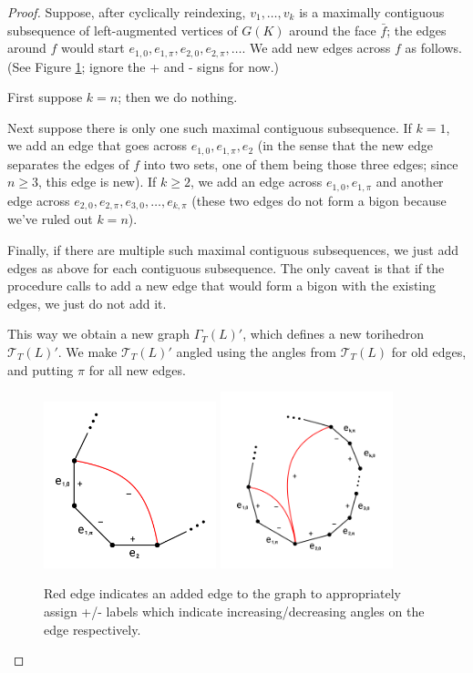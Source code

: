 \documentclass[11pt]{amsart}
\newcommand{\sT}{{\mathcal{T}}}
\theoremstyle{plain}
\theoremstyle{definition}
\begin{document}
\begin{proof}
Suppose, after cyclically reindexing, $v_1,\ldots,v_k$
is a maximally contiguous subsequence of left-augmented vertices
of $G(K)$ around the face $\bar{f}$;
the edges around $f$ would start
$e_{1,0}, e_{1,\pi}, e_{2,0}, e_{2,\pi}, \ldots$.
We add new edges across $f$ as follows.
(See Figure \ref{f:adding_edges};
ignore the + and - signs for now.)


First suppose $k=n$; then we do nothing.

Next suppose there is only one such maximal contiguous subsequence.
If $k = 1$, we add an edge that goes across
$e_{1,0},e_{1,\pi},e_2$
(in the sense that the new edge separates the edges of $f$ into two sets,
one of them being those three edges;
since $n\geq 3$, this edge is new).
If $k \geq 2$,
we add an edge across $e_{1,0},e_{1,\pi}$
and another edge across $e_{2,0},e_{2,\pi},e_{3,0},\ldots,e_{k,\pi}$
(these two edges do not form a bigon because we've ruled out $k=n$).

Finally, if there are multiple such maximal contiguous subsequences,
we just add edges as above for each contiguous subsequence.
The only caveat is that if the procedure calls to add a new edge
that would form a bigon with the existing edges,
we just do not add it.


This way we obtain a new graph $\Gamma_T(L)'$, which defines a
new torihedron $\sT_T(L)'$.
We make $\sT_T(L)'$ angled using the angles from $\sT_T(L)$ for old edges,
and putting $\pi$ for all new edges.


\begin{figure}
\includegraphics[width=5cm]{more_pictures/one_edge.png}
\includegraphics[width=5cm]{more_pictures/two_edge_many.png}
\caption{Red edge indicates an added edge to the graph to appropriately assign +/- labels which indicate 
increasing/decreasing angles on the edge respectively.}
\label{f:adding_edges}
\end{figure}


\end{proof}
\end{document}

